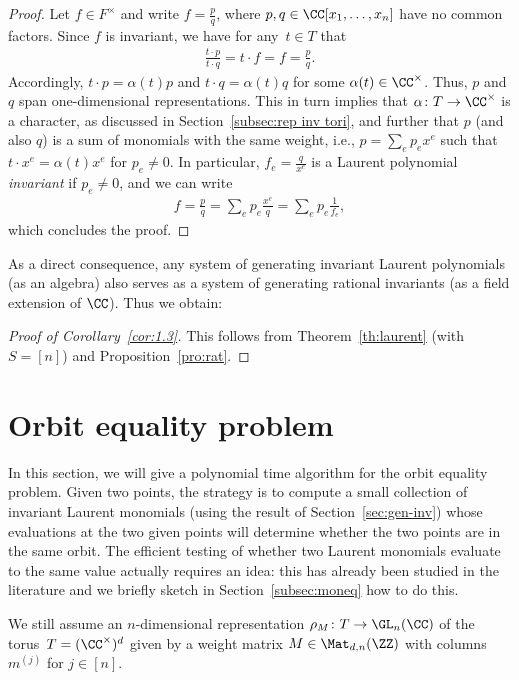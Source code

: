 \begin{proof}
Let $f \in F^\times$ and write $f = \frac p q$, where $p,q \in \CC[x_1,\dots,x_n]$ have no common factors.
Since $f$ is invariant, we have for any~$t \in T$ that 
\begin{align*}
  \frac{t \cdot p}{t \cdot q} = t \cdot f = f = \frac pq.
\end{align*}
%
%
Accordingly, $t \cdot p = \alpha(t) p$ and $t \cdot q = \alpha(t) q$ for some $\alpha(t) \in \CC^\times$.
Thus, $p$ and $q$ span one-dimensional representations.
This in turn implies that $\alpha\colon T \to \CC^\times$ is a character, as discussed in Section~\ref{subsec:rep inv tori}, and further that $p$ (and also $q$) is a sum of monomials with the same weight, i.e., $p = \sum_e p_e x^e$ such that $t \cdot x^e = \alpha(t) x^e$ for $p_e\neq0$.
In particular, $f_e = \frac q {x^e}$ is a Laurent polynomial \emph{invariant} if $p_e\ne 0$, and we can write
\begin{align*}
  f
= \frac p q
= \sum_e p_e \frac{x^e}q
= \sum_e p_e \frac1{f_e},
\end{align*}
which concludes the proof.
\end{proof}

As a direct consequence, any system of generating invariant Laurent polynomials (as an algebra) also serves as a system of generating rational invariants (as a field extension of $\CC$).
Thus we obtain:

\begin{proof}[Proof of Corollary~\ref{cor:1.3}]
This follows from Theorem~\ref{th:laurent} (with $S=[n]$) and Proposition~\ref{pro:rat}.
\end{proof}

%
\section{Orbit equality problem}\label{sec:oe}
%
In this section, we will give a polynomial time algorithm for the orbit equality problem.
Given two points, the strategy is to compute a small collection of invariant Laurent monomials (using the result of Section~\ref{sec:gen-inv})
whose evaluations at the two given points will determine whether the two points are in the same orbit.
The efficient testing of whether two Laurent monomials evaluate to the same value actually requires an idea:
this has already been studied in the literature and we briefly sketch in Section~\ref{subsec:moneq} how to do this.

We still assume an $n$-dimensional representation $\rho_M \colon T \rightarrow \GL_n(\CC)$ of the torus~$T=(\CC^\times)^d$ given by a weight matrix $M \in \Mat_{d,n}(\ZZ)$ with columns $m^{(j)}$ for $j\in[n]$.

